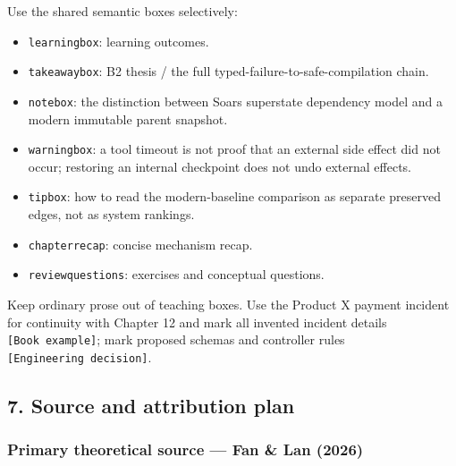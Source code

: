 Use the shared semantic boxes selectively:

\begin{itemize}
\tightlist
\item
  \texttt{learningbox}: learning outcomes.
\item
  \texttt{takeawaybox}: B2 thesis / the full typed-failure-to-safe-compilation chain.
\item
  \texttt{notebox}: the distinction between Soar\textquotesingle s superstate dependency model and a modern immutable parent snapshot.
\item
  \texttt{warningbox}: a tool timeout is not proof that an external side effect did not occur; restoring an internal checkpoint does not undo external effects.
\item
  \texttt{tipbox}: how to read the modern-baseline comparison as separate preserved edges, not as system rankings.
\item
  \texttt{chapterrecap}: concise mechanism recap.
\item
  \texttt{reviewquestions}: exercises and conceptual questions.
\end{itemize}

Keep ordinary prose out of teaching boxes. Use the Product X payment incident for continuity with Chapter 12 and mark all invented incident details \texttt{{[}Book\ example{]}}; mark proposed schemas and controller rules \texttt{{[}Engineering\ decision{]}}.

\subsection{7. Source and attribution plan}\label{7-source-and-attribution-plan}

\subsubsection{Primary theoretical source --- Fan \& Lan (2026)}\label{primary-theoretical-source--fan--lan-2026}

